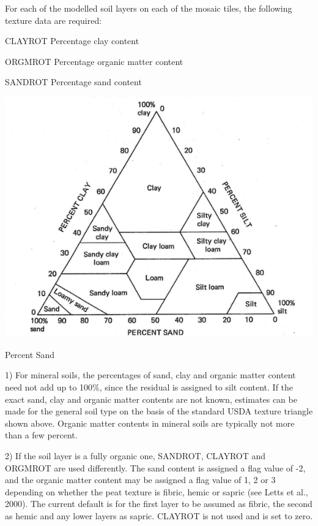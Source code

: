 For each of the modelled soil layers on each of the mosaic tiles, the following texture data are required\+:


\begin{DoxyItemize}
\item C\+L\+A\+Y\+R\+O\+T Percentage clay content
\item O\+R\+G\+M\+R\+O\+T Percentage organic matter content
\item S\+A\+N\+D\+R\+O\+T Percentage sand content
\end{DoxyItemize}


\begin{DoxyImage}
\includegraphics[width=\textwidth,height=\textheight/2,keepaspectratio=true]{percentSand.png}
\caption{Percent Sand}
\end{DoxyImage}
 1) For mineral soils, the percentages of sand, clay and organic matter content need not add up to 100\%, since the residual is assigned to silt content. If the exact sand, clay and organic matter contents are not known, estimates can be made for the general soil type on the basis of the standard U\+S\+D\+A texture triangle shown above. Organic matter contents in mineral soils are typically not more than a few percent.

2) If the soil layer is a fully organic one, S\+A\+N\+D\+R\+O\+T, C\+L\+A\+Y\+R\+O\+T and O\+R\+G\+M\+R\+O\+T are used differently. The sand content is assigned a flag value of -\/2, and the organic matter content may be assigned a flag value of 1, 2 or 3 depending on whether the peat texture is fibric, hemic or sapric (see Letts et al., 2000). The current default is for the first layer to be assumed as fibric, the second as hemic and any lower layers as sapric. C\+L\+A\+Y\+R\+O\+T is not used and is set to zero.

